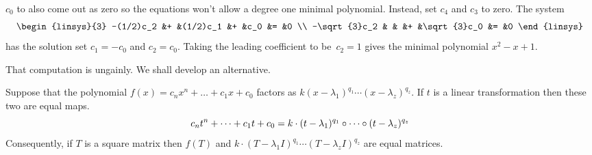 \begin{example}
\( c_0 \) to also come out as zero
so the equations won't allow a degree one minimal polynomial.
Instead, set \( c_4 \) and \( c_3 \) to zero.
The system
\begin{equation*}
  \begin{linsys}{3}           
         -(1/2)c_2
         &+ &(1/2)c_1  
         &+  &c_0  &=  &0      \\
         -\sqrt{3}c_2
         &  &    
         &+ &\sqrt{3}c_0 &=  &0
   \end{linsys} 
\end{equation*}
has the solution set \( c_1=-c_0 \) and \( c_2=c_0 \).
Taking the leading coefficient to be~\( c_2=1 \) 
gives the minimal polynomial $x^2-x+1$. 
\end{example}

That computation is ungainly.
We shall develop an alternative.

\begin{lemma} \label{le:PolyMapsFactor}
Suppose that the polynomial \( f(x)=c_nx^n+\dots+c_1x+c_0 \) factors as
\( k(x-\lambda_1)^{q_1}\cdots(x-\lambda_z)^{q_z} \).
If \( t \) is a linear transformation then these two are equal maps. 
\begin{equation*}
  c_nt^n+\dots+c_1t+c_0
  =
  k\cdot(t-\lambda_1)^{q_1}\mathbin{\circ} \cdots\mathbin{\circ} 
      (t-\lambda_z)^{q_z} 
\end{equation*}
Consequently, if \( T \) is a square matrix then \( f(T) \) and
\( k\cdot(T-\lambda_1I)^{q_1}\cdots(T-\lambda_z I)^{q_z} \) 
are equal matrices.
\end{lemma}

